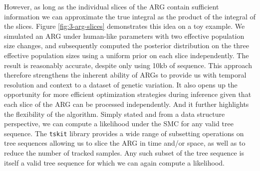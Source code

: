\documentclass{article}
\begin{document}
However, as long as the individual slices of the ARG contain sufficient
information we can approximate the true integral as the product of the
integral of the slices. Figure \ref{fig:3-arg-slices} demonstrates this idea
on a toy example. We simulated an ARG under human-like parameters with
two effective population size changes, and subsequently computed the posterior
distribution on the three effective population sizes
using a uniform prior on each slice independently.
The result is reasonably accurate, despite only using 10kb of sequence.
This approach therefore strengthens
the inherent ability of ARGs to provide us with temporal
resolution and context to a dataset of genetic variation.
It also opens up the opportunity for more efficient optimization
strategies during inference given that each slice of the ARG can be
processed independently. And it further highlights the flexibility
of the algorithm. Simply stated and from a data structure perspective,
we can compute a likelihood under the SMC for any valid tree sequence.
The \texttt{tskit} library provides a wide range
of subsetting operations on tree sequences allowing us to slice
the ARG in time and/or space, as well as to reduce the number of
tracked samples. Any such subset of the tree sequence is itself
a valid tree sequence for which we can again compute a likelihood.
\end{document}

